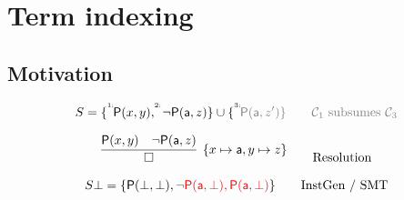 
\section{Term indexing}
\subsection{Motivation}



\begin{example}
	\begin{gather*}
	S = \{ \TI{1}\mP(x,y), \TI{2}\lnot \mP(\ma,z)\} \cup \{\TI{3}\colG\mP(\ma,z') \}
	\tag*{\( \mcC_1 \) subsumes \( \mcC_3 \)}
	\\[0.7em]
	\infer[\{x\mapsto\ma,y\mapsto z\}]
	{\square}
	{\mP(x,y) & \lnot \mP(\ma,z)}
	\tag*{Resolution}
	\\[0.7em]
	S\bot = \{ \mP(\bot,\bot), {\colLo\lnot \mP(\ma,\bot), \mP(\ma,\bot)} \}
	\tag*{InstGen / SMT}
	\end{gather*}
\end{example}

